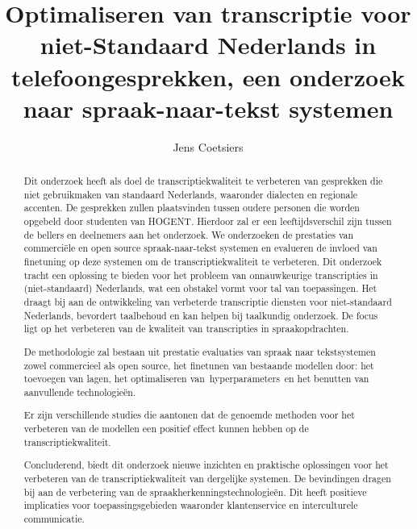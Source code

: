 \documentclass{hogent-article}
\title{Optimaliseren van transcriptie voor niet-Standaard Nederlands in telefoongesprekken, een onderzoek naar spraak-naar-tekst systemen}
\author{Jens Coetsiers}
\begin{document}
\begin{abstract}
Dit onderzoek heeft als doel de transcriptiekwaliteit te verbeteren van gesprekken die niet gebruikmaken van standaard Nederlands, waaronder dialecten en regionale accenten. De gesprekken zullen plaatsvinden tussen oudere personen die worden opgebeld door studenten van HOGENT. Hierdoor zal er een leeftijdsverschil zijn tussen de bellers en deelnemers aan het onderzoek.
We onderzoeken de prestaties van commerciële en open source spraak-naar-tekst systemen en evalueren de invloed van finetuning op deze systemen om de transcriptiekwaliteit te verbeteren. Dit onderzoek tracht een oplossing te bieden voor het probleem van onnauwkeurige transcripties in (niet-standaard) Nederlands, wat een obstakel vormt voor tal van toepassingen. Het draagt bij aan de ontwikkeling van verbeterde transcriptie diensten voor niet-standaard Nederlands, bevordert taalbehoud en kan helpen bij taalkundig onderzoek. De focus ligt op het verbeteren van de kwaliteit van transcripties in spraakopdrachten.

De methodologie zal bestaan uit prestatie evaluaties van spraak naar tekstsystemen zowel commercieel als open source, het finetunen van bestaande modellen door: het toevoegen van lagen, het optimaliseren van hyperparameters en het benutten van aanvullende technologieën.

Er zijn verschillende studies die aantonen dat de genoemde methoden voor het verbeteren van de modellen een positief effect kunnen hebben op de transcriptiekwaliteit.

Concluderend, biedt dit onderzoek nieuwe inzichten en praktische oplossingen voor het verbeteren van de transcriptiekwaliteit van dergelijke systemen. De bevindingen dragen bij aan de verbetering van de spraakherkenningstechnologieën. Dit heeft positieve implicaties voor toepassingsgebieden waaronder klantenservice en interculturele communicatie.
\end{abstract}

\tableofcontents



\printbibliography[heading=bibintoc]
\end{document}
